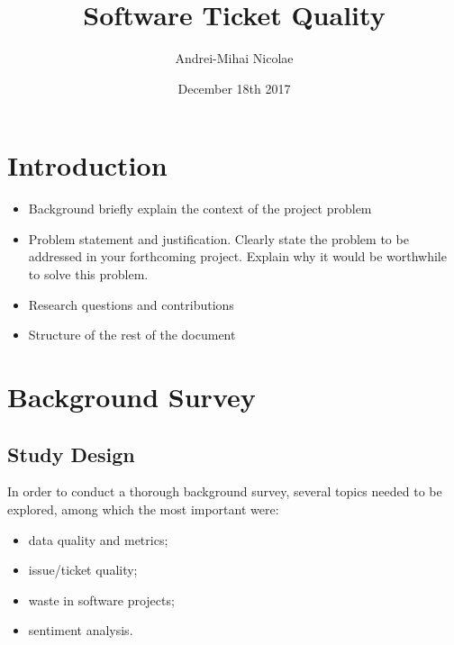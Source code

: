 \documentclass{mprop}
\begin{document}
\title{Software Ticket Quality}
\author{Andrei-Mihai Nicolae}
\date{December 18th 2017}
\maketitle

\tableofcontents
\newpage


\section{Introduction}\label{intro}


\begin{itemize}
\item Background briefly explain the context of the project problem
\item Problem statement and justification. Clearly state the problem to be addressed in your forthcoming project.
  Explain why it would be worthwhile to solve this problem.

\item Research questions and contributions
\item Structure of the rest of the document
\end{itemize}



\section{Background Survey}

\subsection{Study Design}

In order to conduct a thorough background survey, several topics needed to be 
explored, among which the most important were:
  \begin{itemize}
    \item data quality and metrics;
    \item issue/ticket quality;
    \item waste in software projects;
    \item sentiment analysis.
  \end{itemize}
\end{document}
